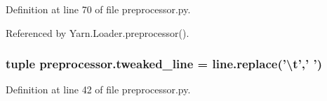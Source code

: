 Definition at line 70 of file preprocessor.\-py.



Referenced by Yarn.\-Loader.\-preprocessor().

\hypertarget{a00321_acab50490b6d7a9dc2bb935ad4ffe2eff}{
\subsubsection[{tweaked\-\_\-line}]{\setlength{\rightskip}{0pt plus 5cm}tuple preprocessor.\-tweaked\-\_\-line = line.\-replace('\textbackslash{}t',' ')}}\label{a00321_acab50490b6d7a9dc2bb935ad4ffe2eff}


Definition at line 42 of file preprocessor.\-py.

